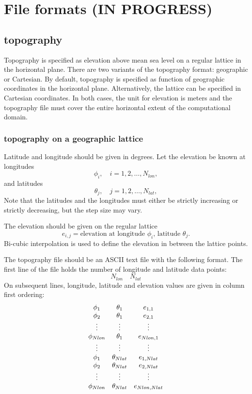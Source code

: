 \documentclass[11pt]{report}
\begin{document}
\chapter{File formats (IN PROGRESS)}\label{chap:formats}
\section{topography}\label{sec:topo-file-format}

Topography is specified as elevation above mean sea level on a regular lattice in the horizontal
plane. There are two variants of the topography format: geographic or Cartesian. By default,
topography is specified as function of geographic coordinates in the horizontal
plane. Alternatively, the lattice can be specified in Cartesian coordinates. In both cases, the unit
for elevation is meters and the topography file must cover the entire horizontal extent of the
computational domain.

\subsection{topography on a geographic lattice}
Latitude and longitude should be given in degrees. Let the elevation be known at longitudes
\[
\phi_i,\quad i=1,2,\ldots,N_{lon},
\]
and latitudes
\[
\theta_j,\quad j=1,2,\ldots,N_{lat},
\]
Note that the latitudes and the longitudes must either be strictly increasing or strictly
decreasing, but the step size may vary.

The elevation should be given on the regular lattice
\[
e_{i,j} = \mbox{elevation at longitude $\phi_i$, latitude $\theta_j$.}
\]
Bi-cubic interpolation is used to define the elevation in between the lattice points.

The topography file should be an ASCII text file with the following format. The first line of the
file holds the number of longitude and latitude data points:
\[
N_{lon}\quad N_{lat}
\]
On subsequent lines, longitude, latitude and elevation values are given in column first ordering:
\[
\begin{array}{c c c}
\phi_1 & \theta_1& e_{1,1}\\
\phi_2& \theta_1& e_{2,1}\\
\vdots&\vdots&\vdots\\
\phi_{Nlon}& \theta_1& e_{Nlon,1}\\
\vdots&\vdots&\vdots\\
\phi_1 & \theta_{Nlat}& e_{1,Nlat}\\
\phi_2& \theta_{Nlat}& e_{2,Nlat}\\
\vdots&\vdots&\vdots\\
\phi_{Nlon}& \theta_{Nlat}& e_{Nlon,Nlat}
\end{array}
\]
\end{document}
